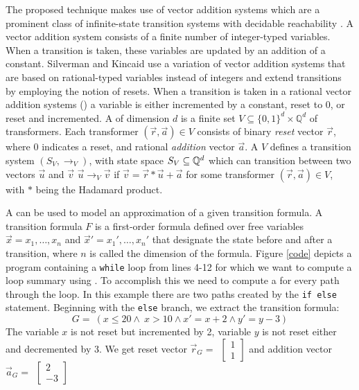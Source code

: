 The proposed technique makes use of vector addition systems which are a prominent class of infinite-state transition systems with decidable reachability \cite{DBLP:conf/rp/HaaseH14}. A vector addition system consists of a finite number of integer-typed variables. When a transition is taken, these variables are updated by an addition of a constant. Silverman and Kincaid use a variation of vector addition systems that are based on rational-typed variables instead of integers and extend transitions by employing the notion of resets. When a transition is taken in a rational vector addition systems (\qvasr) a variable is either incremented by a constant, reset to 0, or reset and incremented.
A \qvasr of dimension $d$ is a finite set $V \subseteq \{0, 1\}^d \times \mathbb{Q}^d$ of transformers. Each transformer $(\vec{r}, \vec{a}) \in V$ consists of binary \textsl{reset} vector $\vec{r}$, where 0 indicates a reset, and rational \textsl{addition} vector $\vec{a}$. A \qvasr $V$ defines a transition system $(S_V, \rightarrow_V)$, with state space $S_V \subseteq \mathbb{Q}^d$ which can transition between two vectors $\vec{u}$ and $\vec{v}$ $\vec{u} \rightarrow_V \vec{v}$ if $\vec{v} = \vec{r} * \vec{u} + \vec{a}$ for some transformer $(\vec{r}, \vec{a}) \in V$, with $*$ being the Hadamard product. \par A \qvasr can be used to model an approximation of a given transition formula. A transition formula $F$ is a first-order formula defined over free variables $\vec{x} = x_1, \ldots, x_n$ and $\vec{x}' = x_1', \ldots, x_n'$ that designate the state before and after a transition, where $n$ is called the dimension of the formula. Figure \ref{code} depicts a program containing a \texttt{while} loop from lines 4-12 for which we want to compute a loop summary using \qvasr. To accomplish this we need to compute a \qvasr for every path through the loop. In this example there are two paths created by the \texttt{if else} statement.
Beginning with the \texttt{else} branch, we extract the transition formula:
\begin{equation*}
	G= \ (x \leq 20 \land\ x > 10 \land x' = x + 2 \land y' = y - 3)
\end{equation*}
The variable $x$ is not reset but incremented by 2, variable $y$ is not reset either and decremented by 3.
We get reset vector $
\vec{r}_G = \ \ 
\begin{bmatrix}
	1 \\
	1 
\end{bmatrix}
$
and addition vector $
\vec{a}_G = \ \ 
\begin{bmatrix}
	2 \\
	-3 
\end{bmatrix}$ \\
